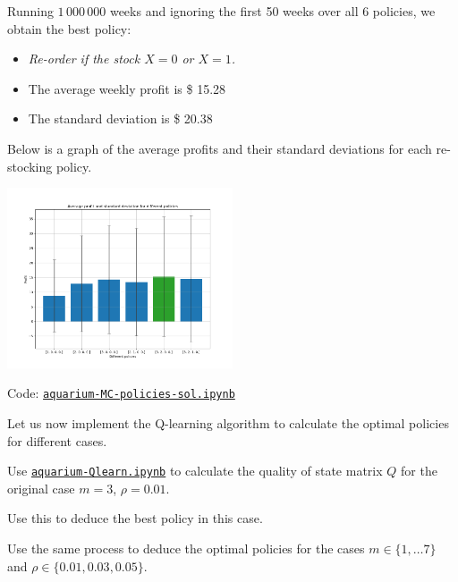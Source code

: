 \begin{solution}
\begin{slide}
\begin{parts}
\setcounter{partsitem}{4}
	\item Running $1\,000\,000$ weeks and ignoring the first 50 weeks over all 6 policies, we obtain the best policy: 
	\begin{itemize}
		\item \textit{Re-order if the stock $X=0$ or $X=1$.}
		\item The average weekly profit is \$ 15.28
		\item The standard deviation is \$ 20.38
	\end{itemize}
	Below is a graph of the average profits and their standard deviations for each re-stocking policy.
	
	\includegraphics[width=0.5\textwidth]{images/aquarium-policies.png}	

	Code: \href{https://utoronto.syzygy.ca/jupyter/user-redirect/git-pull?repo=https://github.com/bigfatbernie/IBLMathModeling&subPath=book/python/aquarium-MC-policies-sol.ipynb}{\tt aquarium-MC-policies-sol.ipynb}
	
	
\end{parts}


	
\end{slide}	
\end{solution}




\begin{slide}
\question


\end{slide}

\begin{slide}
Let us now implement the Q-learning algorithm to calculate the optimal policies for different cases.

\begin{parts}
	\item Use \href{https://utoronto.syzygy.ca/jupyter/user-redirect/git-pull?repo=https://github.com/bigfatbernie/IBLMathModeling&subPath=book/python/aquarium-Qlearn.ipynb}{\tt aquarium-Qlearn.ipynb} to calculate the quality of state matrix $Q$ for the original case $m=3$, $\rho=0.01$.
	\item Use this to deduce the best policy in this case.
	\item Use the same process to deduce the optimal policies for the cases $m \in \{1, \ldots 7\}$ and $\rho \in \{0.01, 0.03, 0.05\}$.
\end{parts}
\end{slide}




